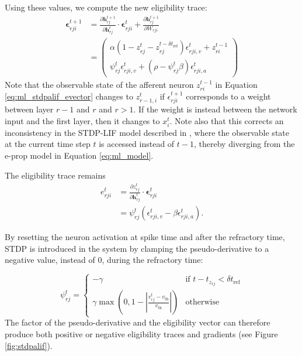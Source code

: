 	        Using these values, we compute the new eligibility trace:
	        \begin{align}
	        \bm{\epsilon}^{t+1}_{rji} &= \frac{\partial\mathbf{h}^{t+1}_{rj}}{\partial\mathbf{h}^t_{rj}}\cdot\bm{\epsilon}^t_{rji} + \frac{\partial\mathbf{h}^{t+1}_{rj}}{\partial W_{rji}}\\
	        &= \begin{pmatrix}
	        \alpha\left(1 - z^t_{rj} - z_{rj}^{t-\delta t_\text{ref}}\right)\epsilon_{rji, v}^t + z_{ri}^{t-1}\\
	        \psi^t_{rj}\epsilon^t_{rji, v} + \left(\rho - \psi^t_{rj}\beta\right)\epsilon^t_{rji,a}
	        \end{pmatrix}\label{eq:ml_stdpalif_evector}
	        \end{align}
	        Note that the observable state of the afferent neuron $z_{ri}^{t-1}$ in Equation \ref{eq:ml_stdpalif_evector} changes to $z_{r-1, i}^t$ if $\epsilon^{t+1}_{rji}$ corresponds to a weight between layer $r-1$ and $r$ and $r > 1$.
	        If the weight is instead between the network input and the first layer, then it changes to $x^t_i$.
	        Note also that this corrects an inconsistency in the STDP-LIF model described in \citet{traub2020learning}, where the observable state at the current time step $t$ is accessed instead of $t-1$, thereby diverging from the e-prop model in Equation \ref{eq:ml_model}.

	        The eligibility trace remains
	        \begin{align}
	        e^{t}_{rji} &= \frac{\partial z^{t}_{rj}}{\partial\mathbf{h}^{t}_{rj}} \cdot \bm{\epsilon}^{t}_{rji}\\
	        &= \psi^t_{rj}\left(\epsilon^t_{rji, v} - \beta\epsilon^t_{rji, a}\right).
	        \end{align}

	        By resetting the neuron activation at spike time and after the refractory time, STDP is introduced in the system by clamping the pseudo-derivative to a negative value, instead of 0, during the refractory time:

	        \begin{equation}
	        \psi^t_{rj} = \begin{cases}
	        -\gamma&\mbox{if } t - t_{z_{rj}} < \delta t_\text{ref}\\
	        \gamma\max\left(0, 1 - \left|\frac{v^t_{rj}-v_\text{th}}{v_\text{th}}\right|\right)&\mbox{otherwise}
	        \end{cases}
	        \end{equation}
	        The factor of the pseudo-derivative and the eligibility vector can therefore produce both positive or negative eligibility traces and gradients (see Figure \ref{fig:stdpalif}).

